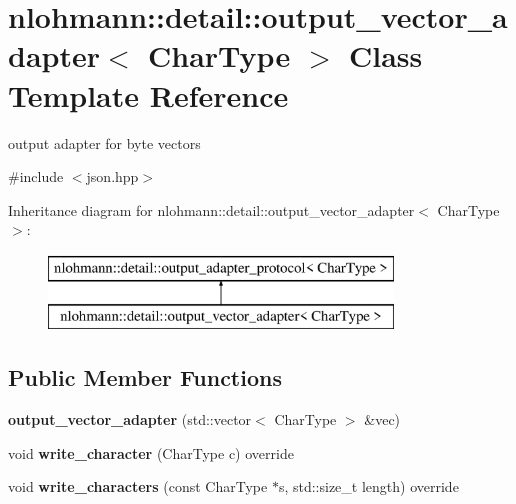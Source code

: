 \hypertarget{classnlohmann_1_1detail_1_1output__vector__adapter}{}\section{nlohmann\+:\+:detail\+:\+:output\+\_\+vector\+\_\+adapter$<$ Char\+Type $>$ Class Template Reference}
\label{classnlohmann_1_1detail_1_1output__vector__adapter}


output adapter for byte vectors  




{\ttfamily \#include $<$json.\+hpp$>$}

Inheritance diagram for nlohmann\+:\+:detail\+:\+:output\+\_\+vector\+\_\+adapter$<$ Char\+Type $>$\+:\begin{figure}[H]
\begin{center}
\leavevmode
\includegraphics[height=2.000000cm]{classnlohmann_1_1detail_1_1output__vector__adapter}
\end{center}
\end{figure}
\subsection*{Public Member Functions}
\begin{DoxyCompactItemize}
\item 
\mbox{\label{classnlohmann_1_1detail_1_1output__vector__adapter_abc6695e8c0274afad31bd581c8acf24f}} 
{\bfseries output\+\_\+vector\+\_\+adapter} (std\+::vector$<$ Char\+Type $>$ \&vec)
\item 
\mbox{\label{classnlohmann_1_1detail_1_1output__vector__adapter_af6a22d4210bb7bc2da66021300ddd6db}} 
void {\bfseries write\+\_\+character} (Char\+Type c) override
\item 
\mbox{\label{classnlohmann_1_1detail_1_1output__vector__adapter_ad6f6c461dec7bedd5359454dc22fc9aa}} 
void {\bfseries write\+\_\+characters} (const Char\+Type $\ast$s, std\+::size\+\_\+t length) override
\end{DoxyCompactItemize}


